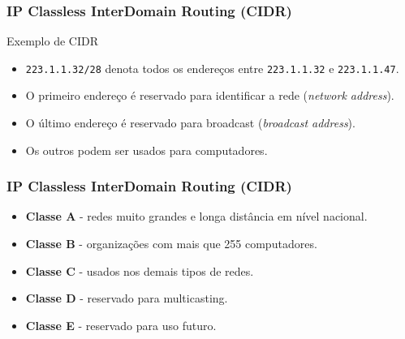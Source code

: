 \documentclass[xcolor=dvipsnames,10pt,compress,aspectratio=169]{beamer}
\begin{document}
\begin{frame}[fragile]
  \frametitle{IP Classless InterDomain Routing (CIDR)}
  \begin{exampleblock}{Exemplo de CIDR}
    \begin{itemize}
    \item \verb+223.1.1.32/28+ denota todos os endereços entre \verb+223.1.1.32+ e
      \verb+223.1.1.47+.
    \item O primeiro endereço é reservado para  identificar a rede (\emph{network address}).
    \item O último endereço é reservado para broadcast (\emph{broadcast address}).
    \item Os  outros podem ser usados para computadores.
    \end{itemize}
  \end{exampleblock}
\end{frame}

\begin{frame}[fragile]
  \frametitle{IP Classless InterDomain Routing (CIDR)}
  \begin{itemize}
  \item {\bf Classe A} - redes muito grandes e longa distância em nível nacional. 
  \item {\bf Classe B} - organizações com mais que 255 computadores.
  \item {\bf Classe C} - usados nos demais tipos de redes.
  \item {\bf Classe D} - reservado para multicasting.
  \item {\bf Classe E} - reservado para uso futuro.
  \end{itemize}
\end{frame}
\end{document}
